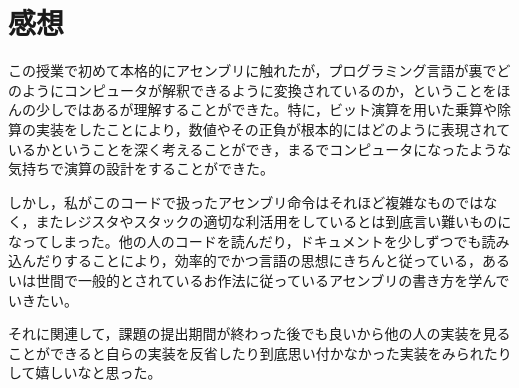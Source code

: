 \documentclass[a4paper]{jsarticle}
\begin{document}
\section{感想}
この授業で初めて本格的にアセンブリに触れたが，プログラミング言語が裏でどのようにコンピュータが解釈できるように変換されているのか，ということをほんの少しではあるが理解することができた。特に，ビット演算を用いた乗算や除算の実装をしたことにより，数値やその正負が根本的にはどのように表現されているかということを深く考えることができ，まるでコンピュータになったような気持ちで演算の設計をすることができた。

しかし，私がこのコードで扱ったアセンブリ命令はそれほど複雑なものではなく，またレジスタやスタックの適切な利活用をしているとは到底言い難いものになってしまった。他の人のコードを読んだり，ドキュメントを少しずつでも読み込んだりすることにより，効率的でかつ言語の思想にきちんと従っている，あるいは世間で一般的とされているお作法に従っているアセンブリの書き方を学んでいきたい。

それに関連して，課題の提出期間が終わった後でも良いから他の人の実装を見ることができると自らの実装を反省したり到底思い付かなかった実装をみられたりして嬉しいなと思った。
\end{document}
